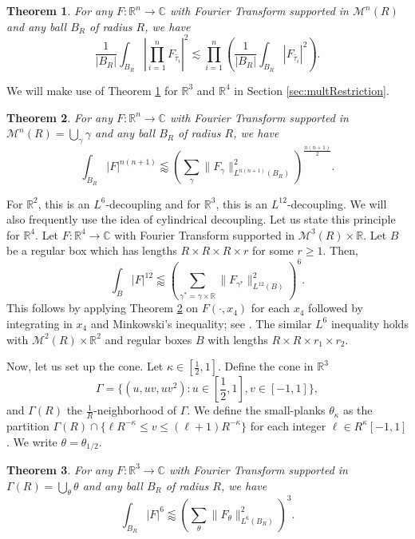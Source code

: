 \documentclass[12pt]{amsart}
\newtheorem{theorem}{Theorem}[section]
\providecommand{\C}{\mathbb C}
\providecommand{\R}{\mathbb R}
\providecommand{\M}{\mathcal{M}}
\begin{document}
\begin{theorem}\label{thm:MultRestrictionMomentCurve} \cite[Ex. 6.33]{demeter2020fourier}
    For any $F:\R^n\to \C$ with Fourier Transform supported in $\M^n(R)$ and any ball $B_R$ of radius $R$, we have $$\frac{1}{|B_R|}\int_{B_R}\left|\prod_{i=1}^nF_{\tilde{\tau_i}}\right|^{2}\lesssim \prod_{i=1}^n \left(\frac{1}{|B_R|}\int_{B_R}|F_{\tilde{\tau_i}}|^2\right).$$
\end{theorem}

We will make use of Theorem \ref{thm:MultRestrictionMomentCurve} for $\R^3$ and $\R^4$ in Section \ref{sec:multRestriction}.

\begin{theorem}\label{thm:BDGmomentcurve}
    \cite[Theorem 1.2]{bourgain2016proofmainconjecturevinogradovs} For any $F:\R^n\to \C$ with Fourier Transform supported in $\M^n(R) = \bigcup_{\gamma} \gamma$ and any ball $B_R$ of radius $R$, we have $$\int_{B_R}|F|^{n(n+1)} \lessapprox \left(\sum_{\gamma}\|F_\gamma\|_{L^{n(n+1)}(B_R)}^2\right)^{\frac{n(n+1)}{2}}.$$
\end{theorem} For $\R^2$, this is an $L^6$-decoupling and for $\R^3$, this is an $L^{12}$-decoupling. We will also frequently use the idea of cylindrical decoupling. Let us state this principle for $\R^4$. Let $F:\R^4\to \C$ with Fourier Transform supported in $\M^3(R)\times \R$. Let $B$ be a regular box which has lengths $R\times R\times R\times r$ for some $r\ge 1$. Then, $$\int_{B}|F|^{12}\lessapprox \left(\sum_{\gamma^*=\gamma\times \R}\|F_{\gamma^*}\|_{L^{12}(B)}^2\right)^{6}.$$ This follows by applying Theorem \ref{thm:BDGmomentcurve} on $F(\cdot, x_4)$ for each $x_4$ followed by integrating in $x_4$ and Minkowski's inequality; see \cite[Ex. 9.22]{demeter2020fourier}. The similar $L^6$ inequality holds with $\M^2(R)\times \R^2$ and regular boxes $B$ with lengths $R\times R\times r_1 \times r_2$.



Now, let us set up the cone. Let $\kappa \in [\frac{1}{2}, 1]$. Define the cone in $\R^3$ $$\Gamma = \{(u, uv, uv^2): u\in [\frac{1}{2}, 1], v\in [-1, 1]\},$$ and $\Gamma(R)$ the $\frac{1}{R}$-neighborhood of $\Gamma$. We define the small-planks $\theta_{\kappa}$ as the partition $\Gamma(R) \cap \{\ell R^{-\kappa}\le v \le (\ell+1)R^{-\kappa}\}$ for each integer $\ell \in R^\kappa[-1,1]$. We write $\theta= \theta_{1/2}$.

\begin{theorem}\label{thm:BDconedec}
    \cite[Theorem 1.2]{demeterCanonicalDecoupling2015}
For any $F:\R^3\to \C$ with Fourier Transform supported in $\Gamma(R) = \bigcup_{\theta} \theta$ and any ball $B_R$ of radius $R$, we have $$\int_{B_R}|F|^6 \lessapprox \left(\sum_{\theta}\|F_\theta\|_{L^6(B_R)}^2\right)^{3}.$$
\end{theorem}
\end{document}

